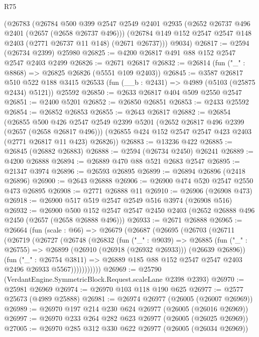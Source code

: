 \begin{lexlean}{R75}
\begin{coremodule}
    (@26783
      (@26784
        @500
        @399
        @2547
        @2549
        @2401
        @2935
        (@2652 @26737 @496 @2401 (@2657 (@2658 @26737 @496)))
        (@26784 @149 @152 @2547 @2547 @148 @2403 (@2771 @26737 @11 @148) (@2671 @26737)))
      @9034)
@26817 := @2594 (@26734 @2399) @25980
@26825 := @4200 @26817 @491 @88 @152 @2547 @2547 @2403 @2499
@26826 := @2671 @26817
@26832 := @26814 (fun ("_" : @8868) => @26825 @26826 (@5551 @109 @2403))
@26845 := @3587
    @26817
    @510
    @522
    @188
    @3415
    @26533
    (fun (__b : @2431) => @4989 (@5103 (@25875 @2434) @5121))
    @25592
@26850 := @2633 @26817 @404 @509 @2550 @2547
@26851 := @2400 @5201
@26852 := @26850 @26851
@26853 := @2433 @25592
@26854 := @26852 @26853
@26855 := @2643 @26817
@26882 := @26854
    (@26855
      @500
      @426
      @2547
      @2549
      @2399
      @5201
      (@2652 @26817 @496 @2399 (@2657 (@2658 @26817 @496)))
      (@26855 @424 @152 @2547 @2547 @423 @2403 (@2771 @26817 @11 @423) @26826))
@26883 := @13236 @422
@26885 := @26845 (@26882 @26883)
@26888 := @2594 (@26734 @2450) @26241
@26889 := @4200 @26888
@26894 := @26889 @470 @88 @521 @2683 @2547
@26895 := @21347 @3974
@26896 := @26593 @26895
@26899 := @26894 @26896 (@2418 @26896)
@26900 := @2643 @26888
@26906 := @26900 @474 @520 @2547 @2550 @473 @26895
@26908 := @2771 @26888 @11
@26910 := @26906 (@26908 @473)
@26918 := @26900 @517 @519 @2547 @2549 @516 @3974 (@26908 @516)
@26932 := @26900
    @500
    @152
    @2547
    @2547
    @2450
    @2403
    (@2652 @26888 @496 @2450 (@2657 (@2658 @26888 @496)))
@26933 := @2671 @26888
@26965 := @26664
    (fun (scale : @66) =>
    @26679
      (@26687
        (@26695
          (@26703
            (@26711
              (@26719
                (@26727
                  (@26748
                    (@26832
                      (fun ("_" : @9039) =>
                      @26885
                        (fun ("_" : @26755) =>
                        @26899 (@26910 (@26918 (@26932 @26933))) (@26639 @26896))
                        (fun ("_" : @26754 @3811) =>
                        @26889 @185 @88 @152 @2547 @2547 @2403 @2496 @26933 @5567)))))))))))
@26969 := @25790 (VerdantEngine.SymmetricBlock.Request.scaleLane @2398 @2393)
@26970 := @25981 @26969
@26974 := @26970 @103 @118 @190 @625
@26977 := @2577 @25673 (@4989 @25888)
@26981 := @26974 @26977 (@26005 (@26007 @26969))
@26989 := @26970 @197 @214 @230 @624 @26977 (@26005 (@26016 @26969))
@26997 := @26970 @233 @264 @282 @623 @26977 (@26005 (@26025 @26969))
@27005 := @26970 @285 @312 @330 @622 @26977 (@26005 (@26034 @26969))

\end{coremodule}
\end{lexlean}
